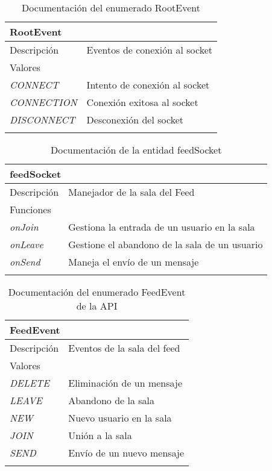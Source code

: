 \begin{longtable}{|p{} p{}|}
    \hline
    \multicolumn{2}{|l|}{\textbf{RootEvent}} \\ \hline \hline
    Descripción      & Eventos de conexión al socket \\ \hline
    \multicolumn{2}{|l|}{Valores} \\
    \emph{CONNECT}  & Intento de conexión al socket  \\
    \emph{CONNECTION}  & Conexión exitosa al socket  \\
    \emph{DISCONNECT}  & Desconexión del socket \\ \hline
    \caption{Documentación del enumerado RootEvent}
    \label{dis:api:root_event}
\end{longtable}

\hspace{\textwidth}
\begin{longtable}{|p{} p{}|}
    \hline
    \multicolumn{2}{|l|}{\textbf{feedSocket}} \\ \hline \hline
    Descripción      & Manejador de la sala del Feed \\ \hline
    \multicolumn{2}{|l|}{Funciones} \\
    \emph{onJoin}  & Gestiona la entrada de un usuario en la sala  \\
    \emph{onLeave}  & Gestione el abandono de la sala de un usuario  \\
    \emph{onSend}  & Maneja el envío de un mensaje  \\ \hline
    \caption{Documentación de la entidad feedSocket}
    \label{dis:api:feed_socket}
\end{longtable}

\begin{longtable}{|p{} p{}|}
    \hline
    \multicolumn{2}{|l|}{\textbf{FeedEvent}} \\ \hline \hline
    Descripción      & Eventos de la sala del feed \\ \hline
    \multicolumn{2}{|l|}{Valores} \\
    \emph{DELETE}  & Eliminación de un mensaje  \\
    \emph{LEAVE}  & Abandono de la sala  \\
    \emph{NEW}  & Nuevo usuario en la sala  \\
    \emph{JOIN}  & Unión a la sala  \\
    \emph{SEND}  & Envío de un nuevo mensaje  \\ \hline
    \caption{Documentación del enumerado FeedEvent de la API}
    \label{dis:api:feed_event}
\end{longtable}

